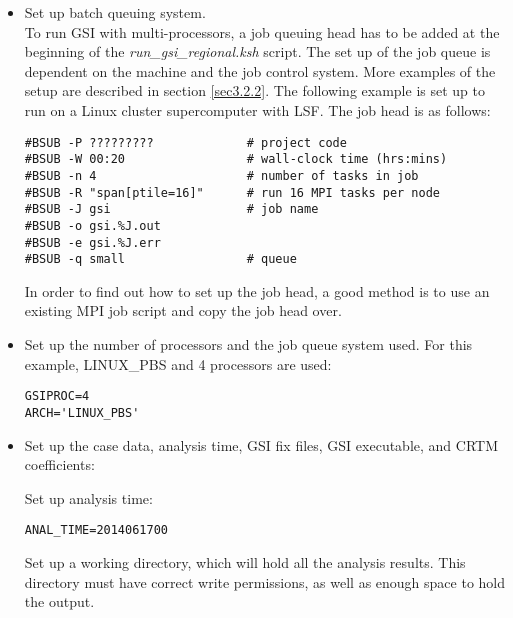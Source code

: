 \begin{itemize}
\item Set up batch queuing system. \\
To run GSI with multi-processors, a job queuing head has to be added at the beginning of the \textit{run\_gsi\_regional.ksh} script.  The set up of the job queue is dependent on the machine and the job control system.  More examples of the setup are described in section \ref{sec3.2.2}. The following example is set up to run on a Linux cluster supercomputer with LSF. The job head is as follows:
 
\begin{scriptsize}
\begin{verbatim}
#BSUB -P ?????????             # project code
#BSUB -W 00:20                 # wall-clock time (hrs:mins)
#BSUB -n 4                     # number of tasks in job         
#BSUB -R "span[ptile=16]"      # run 16 MPI tasks per node
#BSUB -J gsi                   # job name
#BSUB -o gsi.%J.out         
#BSUB -e gsi.%J.err 
#BSUB -q small                 # queue
\end{verbatim}
\end{scriptsize}

In order to find out how to set up the job head, a good method is to use an existing MPI job script and copy the job head over. 
\\

\item Set up the number of processors and the job queue system used.  For this example, LINUX\_PBS and 4 processors are used:

\begin{scriptsize}
\begin{verbatim}
GSIPROC=4
ARCH='LINUX_PBS'
\end{verbatim}
\end{scriptsize}

\item Set up the case data, analysis time, GSI fix files, GSI executable, and CRTM coefficients:

Set up analysis time: 

\begin{scriptsize}
\begin{verbatim}
ANAL_TIME=2014061700
\end{verbatim}
\end{scriptsize}

Set up a working directory, which will hold all the analysis results.  This directory must have correct write permissions, as well as enough space to hold the output. 


\end{itemize}
